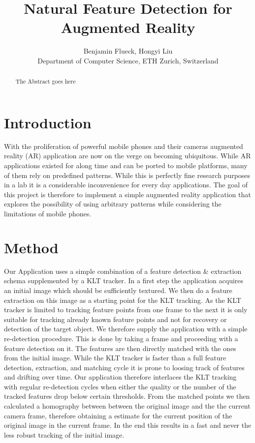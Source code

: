 \documentclass[10pt,conference,compsocconf]{IEEEtran}
\begin{document}
\title{Natural Feature Detection for Augmented Reality}

\author{
  Benjamin Flueck, Hongyi Liu\\
  Department of Computer Science, ETH Zurich, Switzerland\\
}

\maketitle

\begin{abstract}
The Abstract goes here
\end{abstract}

\section{Introduction}

With the proliferation of powerful mobile phones and their cameras augmented reality (AR) application are now on the verge on becoming ubiquitous. While AR applications existed for along time and can be ported to mobile platforms, many of them rely on predefined patterns. While this is perfectly fine research purposes in a lab it is a considerable inconvenience for every day applications. The goal of this project is therefore to implement a simple augmented reality application that explores the possibility of using arbitrary patterns while considering the limitations of mobile phones.

\section{Method}

Our Application uses a simple combination of a feature detection \& extraction schema supplemented by a KLT tracker. In a first step the application acquires an initial image which should be sufficiently textured. We then do a feature extraction on this image as a starting point for the KLT tracking. As the KLT tracker is limited to  tracking feature points from one frame to the next it is only suitable for tracking already known feature points and not for recovery or detection of the target object. We therefore supply the application with a simple re-detection procedure. This is done by taking a frame and proceeding with a feature detection on it. The features are then directly matched with the ones from the initial image. While the KLT tracker is faster than a full feature detection, extraction, and matching cycle it is prone to loosing track of features and drifting over time. Our application therefore interlaces the KLT tracking with regular re-detection cycles when either the quality or the number of the tracked features drop below certain thresholds. From the matched points we then calculated a homography between between the original image and the the current camera frame, therefore obtaining a estimate for the current position of the original image in the current frame.  In the end this results in a fast and never the less robust tracking of the initial image.
\end{document}
